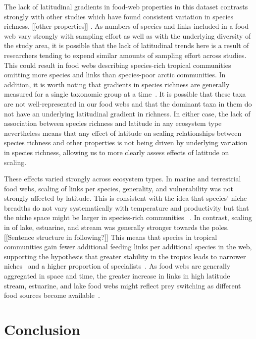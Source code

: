 \documentclass[12pt]{article}
\begin{document}
The lack of latitudinal gradients in food-web properties in this dataset contrasts
strongly with other studies which have found consistent variation in species richness,
[[other properties]] \citep{}. As numbers of species and links included in a food web
vary strongly with sampling effort as well as with the underlying diversity of the study
area, it is possible that the lack of latitudinal trends here is a result of researchers
tending to expend similar amounts of sampling effort across studies. This could result in
food webs describing species-rich tropical communities omitting more species and links
than species-poor arctic communities. In addition, it is worth noting that gradients in
species richness are generally measured for a single taxonomic group at a time~\citep{}.
It is possible that these taxa are not well-represented in our food webs and that the
dominant taxa in them do not have an underlying latitudinal gradient in richness. In
either case, the lack of association between species richness
and latitude in any ecosystem type nevertheless means that any effect of latitude on scaling relationships
between species richness and other properties is not being driven by underlying variation in
species richness, allowing us to more clearly assess effects of latitude on scaling.


These effects varied strongly across ecosystem types. In marine and terrestrial food webs,
scaling of links per species, generality, and vulnerability was not strongly affected by
latitude. This is consistent with the idea that species' niche breadths do not vary systematically
with temperature and productivity but that the niche space might be larger in species-rich communities
~\citep{Davies2007}. In contrast, scaling in of lake, estuarine, and stream was generally stronger
towards the poles. [[Sentence structure in following?]] This means that species in tropical communities gain fewer additional feeding links
per additional species in the web, supporting the hypothesis that greater stability in the tropics
leads to narrower niches~\citep{Brown2004} and a higher proportion of specialists~\citep{}. As food webs
are generally aggregated in space and time, the greater increase in links in high latitude stream, 
estuarine, and lake food webs might reflect prey switching as different food sources become
available~\citep{}. 


\section*{Conclusion}
\end{document}
